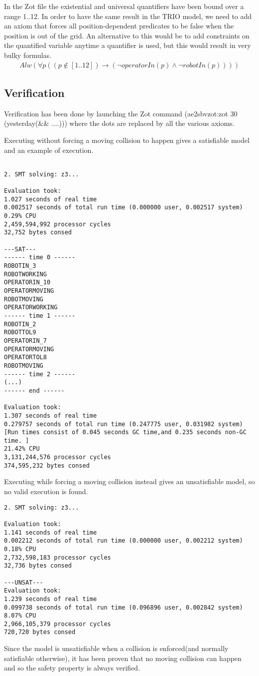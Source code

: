 In the Zot file the existential and universal quantifiers have been bound over a range 1..12. In order to have the same result in the TRIO model, we need to add an axiom that forces all position-dependent predicates to be false when the position is out of the grid. An alternative to this would be to add constraints on the quantified variable anytime a quantifier is used, but this would result in very bulky formulas.
\begin{align*}
	Alw(\forall p ((p\notin[1..12])\longrightarrow(\neg operatorIn(p)\land \neg robotIn(p))))
\end{align*}


\subsection{Verification}
Verification has been done by launching the Zot command	(ae2sbvzot:zot 30 (yesterday(\&\& ....))) where the dots are replaced by all the various axioms.


\vspace{10mm}

Executing without forcing a moving collision to happen gives a satisfiable model and an example of execution.
\begin{verbatim}

2. SMT solving: z3...

Evaluation took:
1.027 seconds of real time
0.002517 seconds of total run time (0.000000 user, 0.002517 system)
0.29% CPU
2,459,594,992 processor cycles
32,752 bytes consed

---SAT---
------ time 0 ------
ROBOTIN_3
ROBOTWORKING
OPERATORIN_10
OPERATORMOVING
ROBOTMOVING
OPERATORWORKING
------ time 1 ------
ROBOTIN_2
ROBOTTOL9
OPERATORIN_7
OPERATORMOVING
OPERATORTOL8
ROBOTMOVING
------ time 2 ------
(...)
------ end ------

Evaluation took:
1.307 seconds of real time
0.279757 seconds of total run time (0.247775 user, 0.031982 system) 
[Run times consist of 0.045 seconds GC time,and 0.235 seconds non-GC time. ]
21.42% CPU
3,131,244,576 processor cycles
374,595,232 bytes consed
\end{verbatim}


\vspace{10mm}

Executing while forcing a moving collision instead gives an unsatisfiable model, so no valid execution is found.

\begin{verbatim}
2. SMT solving: z3...

Evaluation took:
1.141 seconds of real time
0.002212 seconds of total run time (0.000000 user, 0.002212 system)
0.18% CPU
2,732,598,183 processor cycles
32,736 bytes consed

---UNSAT---
Evaluation took:
1.239 seconds of real time
0.099738 seconds of total run time (0.096896 user, 0.002842 system)
8.07% CPU
2,966,105,379 processor cycles
720,720 bytes consed

\end{verbatim}



Since the model is unsatisfiable when a collision is enforced(and normally satisfiable otherwise), it has been proven that no moving collision can happen and so the safety property is always verified.
